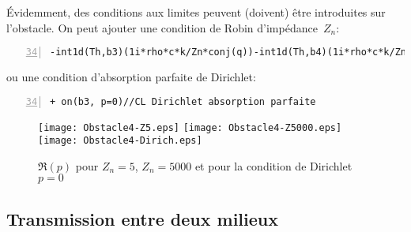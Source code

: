 Évidemment, des conditions aux limites peuvent (doivent) être introduites sur l'obstacle.
On peut ajouter une condition de Robin d'impédance~$Z_n$:
\scriptsize
\begin{Verbatim}[numbers=left,numbersep=3pt,firstnumber=34]
-int1d(Th,b3)(1i*rho*c*k/Zn*conj(q))-int1d(Th,b4)(1i*rho*c*k/Zn*conj(q))// CL Robin
\end{Verbatim}
\normalsize
ou une condition d'absorption parfaite de Dirichlet:
\scriptsize
\begin{Verbatim}[numbers=left,numbersep=3pt,firstnumber=34]
+ on(b3, p=0)//CL Dirichlet absorption parfaite
\end{Verbatim}
\normalsize
\begin{figure}[h!]
\centering
   \texttt{[image: Obstacle4-Z5.eps]}\hfill
   \texttt{[image: Obstacle4-Z5000.eps]}\hfill
   \texttt{[image: Obstacle4-Dirich.eps]}
\caption{$\Re(p)$ pour $Z_n=5$, $Z_n=5000$ et pour la condition de Dirichlet $p=0$}\label{Fig-Obstacle4}
\end{figure}


\medskip
\subsection{Transmission entre deux milieux}

